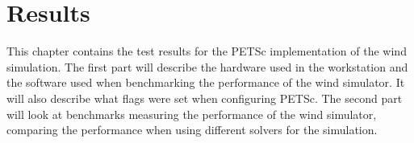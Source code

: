 \chapter{Results}

This chapter contains the test results for the PETSc implementation of the wind
simulation. The first part will describe the hardware used in the workstation
and the software used when benchmarking the performance of the
wind simulator. It will also describe what flags were set when configuring PETSc.
The second part will look at benchmarks measuring the performance of the
wind simulator, comparing the performance when using different solvers for the
simulation.




